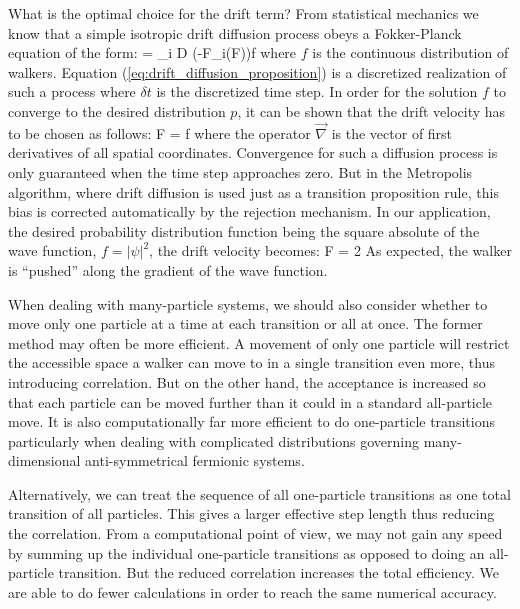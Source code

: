 What is the optimal choice for the drift term? From statistical
mechanics we know that a simple isotropic drift diffusion process
obeys a Fokker-Planck equation of the form:
\be
{} = \sum_i D 
\left(-F_i(\vec F)\right)f
\label{eq:fokker-planck}
\ee
where $f$ is the continuous distribution of walkers.
Equation (\ref{eq:drift_diffusion_proposition}) is a discretized realization
of such a process where $\delta t$ is the discretized time step. In
order for the solution $f$ to converge to the desired distribution
$p$, it can be shown that the drift velocity has to
be chosen as follows:
\bdm
\vec F = \vec\nabla f
\edm
where the operator $\vec\nabla$ is the vector of first derivatives of
all spatial coordinates. Convergence for such a diffusion process is
only guaranteed when the time step approaches zero. But in the
Metropolis algorithm, where drift diffusion is used just as a
transition proposition rule, this bias is corrected automatically by
the rejection mechanism. In our application, the desired probability distribution function  being the
square absolute of the wave function, $f = |\psi|^2$, the drift
velocity becomes:
\be
\vec F = 2\vec\nabla\psi
\label{eq:drift_velocity_VMC}
\ee
As expected, the walker is ``pushed'' along the gradient of the wave
function.

When dealing with many-particle systems, 
we should also consider whether to move only one
particle at a time at each transition or all at once. The former
method may often be more efficient. A movement of only one particle
will restrict the accessible space a walker can move to in a single
transition even more, thus introducing correlation. But on the other
hand, the acceptance is increased so that each particle can be moved
further than it could in a standard all-particle move. It is also
computationally far more efficient to do one-particle transitions
particularly when dealing with complicated distributions governing
many-dimensional anti-symmetrical fermionic systems.

Alternatively, we can treat the sequence of all one-particle
transitions as one total transition of all particles. This gives a
larger effective step length thus reducing the correlation. From a
computational point of view, we may not gain any speed by summing up the
individual one-particle transitions as opposed to doing an
all-particle transition. But the reduced correlation increases the
total efficiency. We are able to do fewer calculations in order to
reach the same numerical accuracy.

